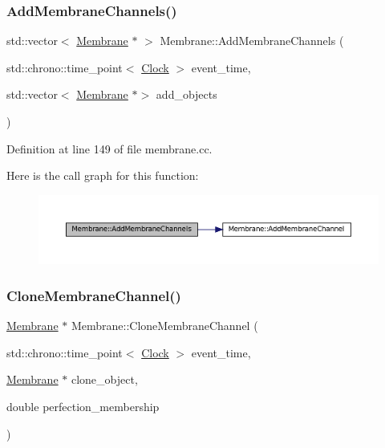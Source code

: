 \subsubsection{\texorpdfstring{Add\+Membrane\+Channels()}{AddMembraneChannels()}}
{\footnotesize\ttfamily std\+::vector$<$ \mbox{\hyperlink{class_membrane}{Membrane}} $\ast$ $>$ Membrane\+::\+Add\+Membrane\+Channels (\begin{DoxyParamCaption}\item[{std\+::chrono\+::time\+\_\+point$<$ \mbox{\hyperlink{universe_8h_a0ef8d951d1ca5ab3cfaf7ab4c7a6fd80}{Clock}} $>$}]{event\+\_\+time,  }\item[{std\+::vector$<$ \mbox{\hyperlink{class_membrane}{Membrane}} $\ast$$>$}]{add\+\_\+objects }\end{DoxyParamCaption})}



Definition at line 149 of file membrane.\+cc.

Here is the call graph for this function\+:\nopagebreak
\begin{figure}[H]
\begin{center}
\leavevmode
\includegraphics[width=350pt]{class_membrane_aab591875e3266d6c5af0f7c5f7f21e8f_cgraph}
\end{center}
\end{figure}
\mbox{\label{class_membrane_a9514ca4d4378e6467d2059a9d5f9b99b}} 
\subsubsection{\texorpdfstring{Clone\+Membrane\+Channel()}{CloneMembraneChannel()}}
{\footnotesize\ttfamily \mbox{\hyperlink{class_membrane}{Membrane}} $\ast$ Membrane\+::\+Clone\+Membrane\+Channel (\begin{DoxyParamCaption}\item[{std\+::chrono\+::time\+\_\+point$<$ \mbox{\hyperlink{universe_8h_a0ef8d951d1ca5ab3cfaf7ab4c7a6fd80}{Clock}} $>$}]{event\+\_\+time,  }\item[{\mbox{\hyperlink{class_membrane}{Membrane}} $\ast$}]{clone\+\_\+object,  }\item[{double}]{perfection\+\_\+membership }\end{DoxyParamCaption})}



